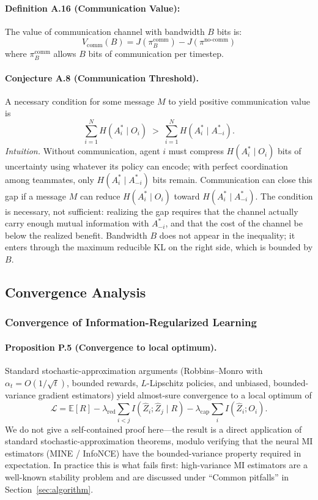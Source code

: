\documentclass[10pt, letterpaper]{article}
\begin{document}
\paragraph{Definition A.16 (Communication Value):} The value of communication channel with bandwidth $B$ bits is:
\[V_{\text{comm}}(B) = J(\pi^{\text{comm}}_B) - J(\pi^{\text{no-comm}})\]
where $\pi^{\text{comm}}_B$ allows $B$ bits of communication per timestep.

\paragraph{Conjecture A.8 (Communication Threshold).} A necessary condition for some message $M$ to yield positive communication value is
\[\sum_{i=1}^N H(A_i^* \mid O_i) \;>\; \sum_{i=1}^N H(A_i^* \mid A_{-i}^*).\]
\emph{Intuition.} Without communication, agent $i$ must compress $H(A_i^*\mid O_i)$ bits of uncertainty using whatever its policy can encode; with perfect coordination among teammates, only $H(A_i^*\mid A_{-i}^*)$ bits remain. Communication can close this gap if a message $M$ can reduce $H(A_i^*\mid O_i)$ toward $H(A_i^*\mid A_{-i}^*)$. The condition is necessary, not sufficient: realizing the gap requires that the channel actually carry enough mutual information with $A_{-i}^*$, and that the cost of the channel be below the realized benefit. Bandwidth $B$ does not appear in the inequality; it enters through the maximum reducible KL on the right side, which is bounded by $B$.

\subsection{Convergence Analysis}

\subsubsection{Convergence of Information-Regularized Learning}

\paragraph{Proposition P.5 (Convergence to local optimum).} Standard stochastic-approximation arguments (Robbins--Monro with $\alpha_t = O(1/\sqrt{t})$, bounded rewards, $L$-Lipschitz policies, and unbiased, bounded-variance gradient estimators) yield almost-sure convergence to a local optimum of
\[\mathcal{L} = \mathbb{E}[R] - \lambda_\text{red} \sum_{i<j} I(\hat{Z}_i; \hat{Z}_j \mid R) - \lambda_\text{cap} \sum_i I(\hat{Z}_i; O_i).\]
We do not give a self-contained proof here---the result is a direct application of standard stochastic-approximation theorems, modulo verifying that the neural MI estimators (MINE / InfoNCE) have the bounded-variance property required in expectation. In practice this is what fails first: high-variance MI estimators are a well-known stability problem and are discussed under ``Common pitfalls'' in Section~\ref{sec:algorithm}.
\end{document}
